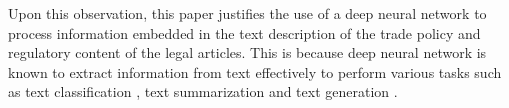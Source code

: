 Upon this observation, this paper justifies the use of a deep neural network to process information embedded in the text description of the trade policy and regulatory content of the legal articles. This is because deep neural network is known to
extract information from text effectively to perform various tasks such as text classification \citep{minaee2020deep}, text summarization \citep{textsum} and text generation \citep{guo2017long}.
 
 
 
 
 
 

